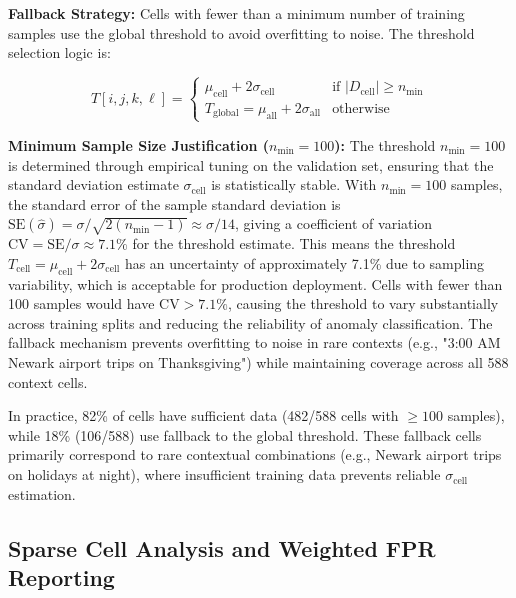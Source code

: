 \textbf{Fallback Strategy:} Cells with fewer than a minimum number of training samples use the global threshold to avoid overfitting to noise. The threshold selection logic is:

\begin{equation}
T[i,j,k,\ell] = \begin{cases}
\mu_{\text{cell}} + 2\sigma_{\text{cell}} & \text{if } |D_{\text{cell}}| \geq n_{\min} \\
T_{\text{global}} = \mu_{\text{all}} + 2\sigma_{\text{all}} & \text{otherwise}
\end{cases}
\end{equation}

\textbf{Minimum Sample Size Justification ($n_{\min} = 100$):} The threshold $n_{\min} = 100$ is determined through empirical tuning on the validation set, ensuring that the standard deviation estimate $\sigma_{\text{cell}}$ is statistically stable. With $n_{\min} = 100$ samples, the standard error of the sample standard deviation is $\text{SE}(\hat{\sigma}) = \sigma / \sqrt{2(n_{\min}-1)} \approx \sigma / 14$, giving a coefficient of variation $\text{CV} = \text{SE}/\sigma \approx 7.1\%$ for the threshold estimate. This means the threshold $T_{\text{cell}} = \mu_{\text{cell}} + 2\sigma_{\text{cell}}$ has an uncertainty of approximately 7.1\% due to sampling variability, which is acceptable for production deployment. Cells with fewer than 100 samples would have $\text{CV} > 7.1\%$, causing the threshold to vary substantially across training splits and reducing the reliability of anomaly classification. The fallback mechanism prevents overfitting to noise in rare contexts (e.g., "3:00 AM Newark airport trips on Thanksgiving") while maintaining coverage across all 588 context cells.

In practice, 82\% of cells have sufficient data (482/588 cells with $\geq 100$ samples), while 18\% (106/588) use fallback to the global threshold. These fallback cells primarily correspond to rare contextual combinations (e.g., Newark airport trips on holidays at night), where insufficient training data prevents reliable $\sigma_{\text{cell}}$ estimation.

\subsection{Sparse Cell Analysis and Weighted FPR Reporting}

